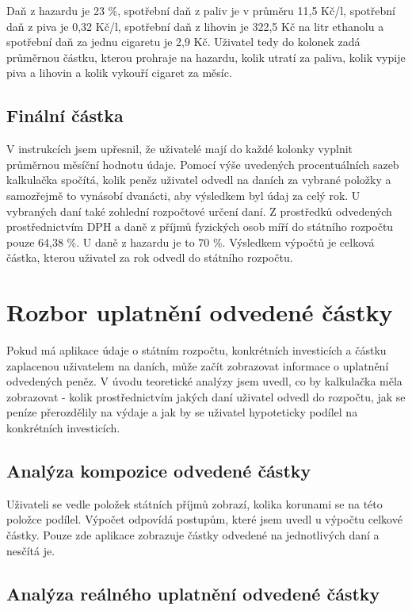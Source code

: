 \documentclass[11pt,a4paper,twoside,openright]{report}
\begin{document}
Daň z hazardu je 23 \%, spotřební daň z paliv je v průměru 11,5 Kč/l, spotřební daň z piva je 0,32 Kč/l, spotřební daň z lihovin je 322,5 Kč na litr ethanolu a spotřební daň za jednu cigaretu je 2,9 Kč. Uživatel tedy do kolonek zadá průměrnou částku, kterou prohraje na hazardu, kolik utratí za paliva, kolik vypije piva a lihovin a kolik vykouří cigaret za měsíc.

\subsection{Finální částka}

V instrukcích jsem upřesnil, že uživatelé mají do každé kolonky vyplnit průměrnou měsíční hodnotu údaje.
Pomocí výše uvedených procentuálních sazeb kalkulačka spočítá, kolik peněz uživatel odvedl na
daních za vybrané položky a samozřejmě to vynásobí dvanácti, aby výsledkem byl údaj za celý rok.
U vybraných daní také zohlední rozpočtové určení daní. Z prostředků odvedených prostřednictvím
DPH a daně z příjmů fyzických osob míří do státního rozpočtu pouze 64,38 \%. U daně z hazardu
je to 70 \%. Výsledkem výpočtů je celková částka, kterou uživatel za rok odvedl do státního rozpočtu.

\section{Rozbor uplatnění odvedené částky}

Pokud má aplikace údaje o státním rozpočtu, konkrétních investicích a částku zaplacenou
uživatelem na daních, může začít zobrazovat informace o uplatnění odvedených peněz. V úvodu
teoretické analýzy jsem uvedl, co by kalkulačka měla zobrazovat - kolik prostřednictvím
jakých daní uživatel odvedl do rozpočtu, jak se peníze přerozdělily na výdaje a jak
by se uživatel hypoteticky podílel na konkrétních investicích.

\subsection{Analýza kompozice odvedené částky}

Uživateli se vedle položek státních příjmů zobrazí, kolika korunami se na této položce podílel.
Výpočet odpovídá postupům, které jsem uvedl u výpočtu celkové částky. Pouze zde aplikace
zobrazuje částky odvedené na jednotlivých daní a nesčítá je.

\subsection{Analýza reálného uplatnění odvedené částky}
\end{document}
